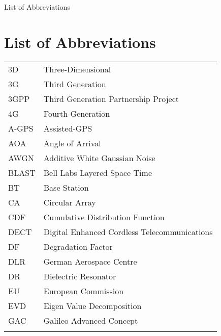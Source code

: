 \tableofcontents   %
\listoffigures     %
\listoftables      %

\iffalse
List of Abbreviations
\chapter*{List of Abbreviations}
\begin{tabular}{ll}
\\
3D & Three-Dimensional\\

3G & Third Generation\\

3GPP & Third Generation Partnership Project\\

4G & Fourth-Generation\\

A-GPS & Assisted-GPS\\

AOA & Angle of Arrival\\

AWGN & Additive White Gaussian Noise\\

BLAST & Bell Labs Layered Space Time\\

BT & Base Station\\

CA & Circular Array\\

CDF & Cumulative Distribution Function\\

DECT  &  Digital Enhanced Cordless Telecommunications\\

DF & Degradation Factor\\

DLR & German Aerospace Centre\\


DR & Dielectric Resonator\\

EU  & European Commission \\


EVD & Eigen Value Decomposition \\

GAC & Galileo Advanced Concept\\



\\
\end{tabular}


